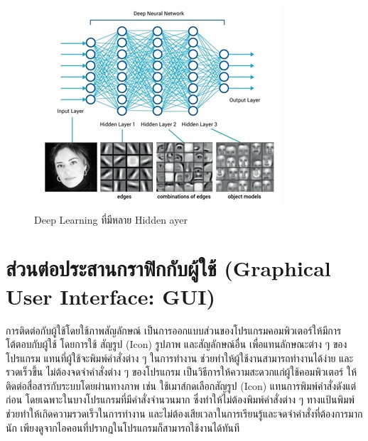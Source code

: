 \begin{figure}[!ht]
  \begin{center}
    \includegraphics[scale=.9]{pic/deep2.jpg}
    \caption[Deep Learning ที่มีหลาย Hidden ayer]{Deep Learning ที่มีหลาย Hidden ayer}
    \label{fig:deep2}
  \end{center}
\end{figure}

\section{ส่วนต่อประสานกราฟิกกับผู้ใช้ (Graphical User Interface: GUI)}
การติดต่อกับผู้ใช้โดยใช้ภาพสัญลักษณ์ เป็นการออกแบบส่วนของโปรแกรมคอมพิวเตอร์ให้มีการโต้ตอบกับผู้ใช้ โดยการใช้ สัญรูป (Icon) รูปภาพ และสัญลักษณ์อื่น 
เพื่อแทนลักษณะต่าง ๆ ของโปรแกรม แทนที่ผู้ใช้จะพิมพ์คำสั่งต่าง ๆ ในการทำงาน ช่วยทำให้ผู้ใช้งานสามารถทำงานได้ง่าย และรวดเร็วขึ้น ไม่ต้องจดจำคำสั่งต่าง ๆ 
ของโปรแกรม เป็นวิธีการให้ความสะดวกแก่ผู้ใช้คอมพิวเตอร์ ให้ติดต่อสื่อสารกับระบบโดยผ่านทางภาพ เช่น ใช้เมาส์กดเลือกสัญรูป (Icon) แทนการพิมพ์คำสั่งดังแต่ก่อน 
โดยเฉพาะในบางโปรแกรมที่มีคำสั่งจำนวนมาก ซึ่งทำให้ไม่ต้องพิมพ์คำสั่งต่าง ๆ ทางแป้นพิมพ์ ช่วยทำให้เกิดความรวดเร็วในการทำงาน 
และไม่ต้องเสียเวลาในการเรียนรู้และจดจำคำสั่งที่ต้องการมากนัก เพียงดูจากไอคอนที่ปรากฏในโปรแกรมก็สามารถใช้งานได้ทันที \cite{GUI}

